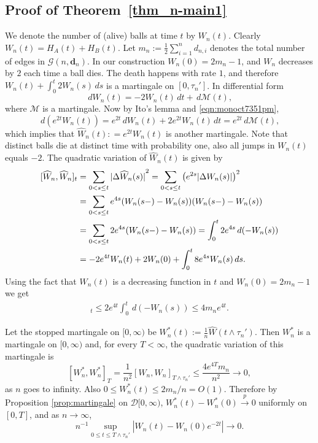\documentclass[11pt]{article}
\def\top{\stackrel{p}{\longrightarrow}}
\newcommand{\cD}{\mathcal{D}}
\newcommand{\cG}{\mathcal{G}}
\newcommand\bd{\mathbf{d}}
\def\top{\stackrel{p}{\longrightarrow}}
\begin{document}
\subsection{Proof of Theorem~\ref{thm_n-main1}}\label{sec:proofMain}
We denote the number of (alive) balls at time $t$ by $W_n(t)$. Clearly $W_n(t)= H_A(t) +H_B(t)$. Let $m_n:=\frac{1}{2} \sum_{i=1}^n d_{n,i}$ denotes the total number of edges in $\cG(n,\bd_n)$. In our construction $W_n(0)=2m_n-1$, and $W_n$ decreases by $2$ each time a ball dies. The death happens with rate $1$, and therefore $W_n(t)+\int_{0}^t 2W_n(s)\, ds$ is a martingale on $[0,\tau_n']$. In differential form 
\begin{equation}\label{eqn:monoct7351pm}
\, dW_n(t) = -2W_n(t)\, dt +\, d\mathcal{M}(t),
\end{equation}
where $\mathcal{M}$ is a martingale. Now by Ito's lemma and \eqref{eqn:monoct7351pm},
\[
\, d(e^{2t} W_n(t)) = e^{2t} \, dW_n(t) +2e^{2t} W_n(t) \, dt = e^{2t} \, d\mathcal{M}(t), 
\]
which implies that $\widehat{W}_n(t) : = e^{2t} W_n(t)$ is another martingale. Note that distinct balls die at distinct time with probability one, also all jumps in $W_n(t)$ equals $-2$. The quadratic variation of $\widehat{W}_n(t)$ is given by
\begin{align}\label{eqn:monoct7736pm}
[\widehat{W}_n, \widehat{W}_n]_t &= \sum_{0<s\leq t} {|\Delta\widehat{W}_n(s)|}^2 = \sum_{0<s\leq t} \left(e^{2s}|\Delta{W}_n(s)|\right)^2 \notag \\
& = \sum_{0<s \leq t} e^{4s} ({W}_n(s-)- W_n(s)) ({W}_n(s-)- W_n(s)) \notag \\
&= \sum_{0<s \leq t} 2e^{4s} ({W}_n(s-)- W_n(s)) = \int_{0}^{t} 2 e^{4s} \, d(-W_n(s)) \notag \\
&= -2e^{4t} W_n(t) +2W_n(0) +\int_{0}^t 8 e^{4s}W_n(s) \, ds.
\end{align}
Using the fact that $W_n(t)$ is a decreasing function in $t$ and $W_n(0) = 2m_n-1$ we get
\begin{align*}
[\widehat{W}_n, \widehat{W}_n]_t \leq 2e^{4t} \int_{0}^t \,d(-W_n(s)) \leq 4 m_n e^{4t}.
\end{align*}

Let the stopped martingale on $[0,\infty)$ be $W_n^*(t) := \frac{1}{n}\widehat{W}(t \wedge \tau_n')$. Then $W_n^*$ is a martingale on $[0,\infty)$ and, for every $T<\infty$, the quadratic variation of this martingale is
\begin{equation}\label{eqn:frifeb21325pm}
[W_n^*, W_n^*]_T = \frac{1}{n^2} [W_n, W_n]_{T \wedge \tau_n'} \leq \frac{4e^{4T}m
_n}{n^2} \longrightarrow 0,
\end{equation}
as $n$ goes to infinity. Also $0\leq W_n^*(t) \leq 2m_n/n = O(1)$. Therefore by Proposition \ref{prop:martingale} on $\cD[0,\infty)$, 
$W_n^*(t) - W_n^*(0) \top 0$ uniformly on $[0,T]$, and as $n\to \infty$,
\begin{equation}\label{eqn:oct151728}
n^{-1} \sup_{0\leq t\leq T \wedge \tau_n'} |W_n(t)- W_n(0)e^{-2t}| \longrightarrow 0.
\end{equation}
\end{document}
